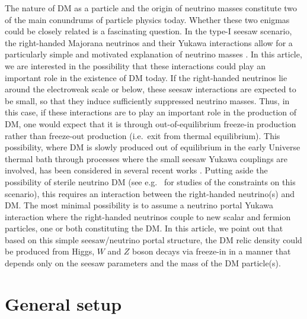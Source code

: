 \documentclass[prd,a4paper,twocolumn,preprintnumbers,nofootinbib,superscriptaddress]{revtex4}
\begin{document}
	\maketitle
	
The nature of DM as a particle and the origin of neutrino masses constitute two of the main conundrums of particle physics today.
Whether these two enigmas could be closely related is a fascinating question.
In the type-I seesaw scenario, the right-handed Majorana neutrinos and their Yukawa interactions 
allow for a particularly simple and motivated explanation of neutrino masses \cite{Minkowski:1977sc,Yanagida:1979as,GellMann:1980vs,Mohapatra:1979ia}.
In this article, we are interested in the possibility that these interactions could play an important role in the existence of DM today.
If the right-handed neutrinos lie around the electroweak scale or below, these seesaw interactions are expected to be small, so that they induce sufficiently suppressed neutrino masses. Thus, in this case, if these interactions are to play an important role in the production of DM, one would expect that it is  through out-of-equilibrium freeze-in production \cite{McDonald:2001vt,Hall:2009bx} rather than freeze-out production (i.e.~exit from thermal equilibrium). This possibility, where DM is slowly produced out of equilibrium in the early Universe thermal bath through processes where the small seesaw Yukawa couplings are involved, has been considered in several recent works \cite{Aoki:2015nza,Becker:2018rve,Bandyopadhyay:2020qpn,Ma:2021bzl,Chianese:2021toe}.
Putting aside the possibility of sterile neutrino DM (see e.g.~\cite{Dodelson:1993je,Shi:1998km,Boyarsky:2018tvu,Lucente:2021har} for studies of the constraints on this scenario), this requires an interaction between the right-handed neutrino(s) and DM. The most minimal possibility is to assume a neutrino portal Yukawa interaction
where the right-handed neutrinos couple to new scalar and fermion particles, one or both constituting the DM. 
In this article, we point out that based on this simple seesaw/neutrino portal structure, the DM relic density could be produced from Higgs, $W$ and $Z$ boson decays via freeze-in in a manner that depends only on the seesaw parameters and the mass of the DM particle(s). 
	
	
	
	
\section{General setup}
	
\end{document}
